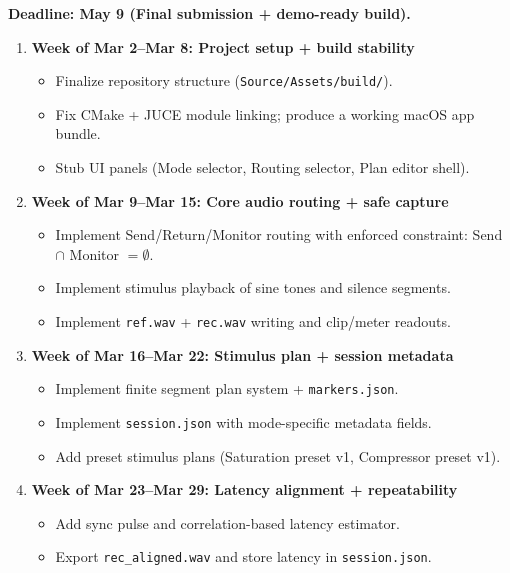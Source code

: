 \documentclass[11pt, letterpaper]{article}
\begin{document}
\textbf{Deadline: May 9 (Final submission + demo-ready build).}

\begin{enumerate}[leftmargin=1.5em]
    \item \textbf{Week of Mar 2--Mar 8: Project setup + build stability}
          \begin{itemize}[leftmargin=1.5em]
              \item Finalize repository structure (\texttt{Source/Assets/build/}).
              \item Fix CMake + JUCE module linking; produce a working macOS app bundle.
              \item Stub UI panels (Mode selector, Routing selector, Plan editor shell).
          \end{itemize}
    \item \textbf{Week of Mar 9--Mar 15: Core audio routing + safe capture}
          \begin{itemize}[leftmargin=1.5em]
              \item Implement Send/Return/Monitor routing with enforced constraint: Send $\cap$ Monitor $= \emptyset$.
              \item Implement stimulus playback of sine tones and silence segments.
              \item Implement \texttt{ref.wav} + \texttt{rec.wav} writing and clip/meter readouts.
          \end{itemize}
    \item \textbf{Week of Mar 16--Mar 22: Stimulus plan + session metadata}
          \begin{itemize}[leftmargin=1.5em]
              \item Implement finite segment plan system + \texttt{markers.json}.
              \item Implement \texttt{session.json} with mode-specific metadata fields.
              \item Add preset stimulus plans (Saturation preset v1, Compressor preset v1).
          \end{itemize}
    \item \textbf{Week of Mar 23--Mar 29: Latency alignment + repeatability}
          \begin{itemize}[leftmargin=1.5em]
              \item Add sync pulse and correlation-based latency estimator.
              \item Export \texttt{rec\_aligned.wav} and store latency in \texttt{session.json}.

\end{itemize}
\end{enumerate}
\end{document}
